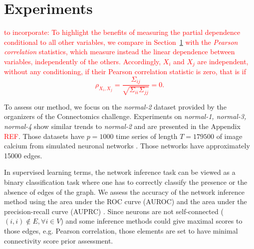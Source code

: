 \documentclass[wcp]{jmlr}
\begin{document}
\section{Experiments} \label{sec:results}

\textcolor{red}{to incorporate: 
To highlight the benefits of measuring the partial dependence conditional to
all other variables, we compare in Section~\ref{sec:results} with the
\textit{Pearson correlation} statistics, which measure instead the linear
dependence between variables, independently of the others. Accordingly, $X_i$
and $X_j$ are independent, without any conditioning, if their Pearson correlation statistic is zero, that
is if
\begin{equation}
\rho_{X_i,X_j} = \frac{\Sigma_{ij}}{\sqrt{\Sigma_{ii} \Sigma_{jj}}} = 0.
\end{equation}}


To assess our method, we focus on the \textit{normal-2} dataset
provided by the organizers of the Connectomics challenge. Experiments
on \textit{normal-1, normal-3, normal-4} show similar trends to
\textit{normal-2} and are presented in the Appendix \textcolor{red}{REF}.
Those datasets have $p=1000$ time series of length $T=179500$ of image
calcium from simulated neuronal networks \citep{stetter2012model}. Those
networks have approximately 15000 edges.

In supervised learning terms, the network inference task can be viewed as a
binary classification task where one has to correctly classify the presence or
the absence of edges of the graph. We assess the accuracy of the network
inference method using the area under the ROC curve (AUROC) and the area under
the precision-recall curve (AUPRC) \citep{schrynemackers2013protocols}. Since
neurons are not self-connected ($(i, i) \not \in E, \forall i \in V$) and some
inference methods could give maximal scores to those edges, e.g. Pearson
correlation, those elements are set to have minimal connectivity score prior
assessment.
\end{document}

